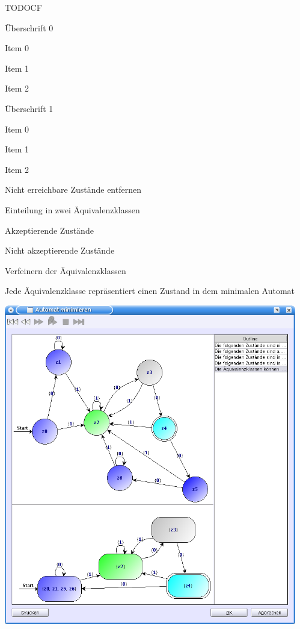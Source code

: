 {
TODOCF \\
    \begin{itemgroup}{Überschrift 0}
	\item Item 0
	\item Item 1
	\item Item 2
	\end{itemgroup}
    
	\begin{itemgroup}{Überschrift 1}
	\item Item 0
	\item Item 1
	\item Item 2
	\end{itemgroup}
  
	\vfill{}
}

{
    \begin{itemgroup}{}
	\item Nicht erreichbare Zustände entfernen
	\item Einteilung in zwei Äquivalenzklassen
		\begin{itemgroup}{}
		\item Akzeptierende Zustände
		\item Nicht akzeptierende Zustände
		\end{itemgroup}
	\item Verfeinern der Äquivalenzklassen
	\item Jede Äquivalenzklasse repräsentiert einen Zustand in dem minimalen
	Automat
	\end{itemgroup}
	
	\vfill{}    
}

{
  \begin{center}
    \includegraphics[height=14cm]{../images/minimize.png}
  \end{center}   
}


